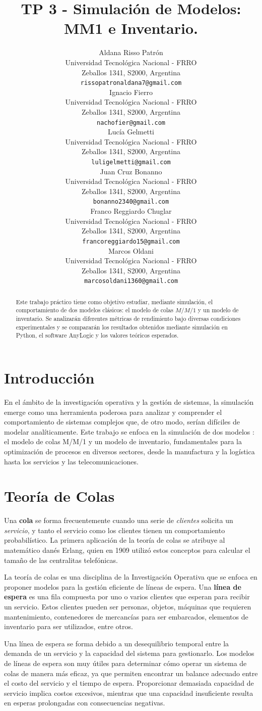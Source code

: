 \documentclass{article}
\title{TP 3 - Simulación de Modelos: MM1 e Inventario.}
\author{
 Aldana Risso Patrón \\
  Universidad Tecnológica Nacional - FRRO \\
  Zeballos 1341, S2000, Argentina \\
  \texttt{rissopatronaldana7@gmail.com} \\
   \And
 Ignacio Fierro \\
  Universidad Tecnológica Nacional - FRRO \\
  Zeballos 1341, S2000, Argentina \\
  \texttt{nachofier@gmail.com} \\
  \And
 Lucía Gelmetti \\
  Universidad Tecnológica Nacional - FRRO \\
  Zeballos 1341, S2000, Argentina \\
  \texttt{luligelmetti@gmail.com} \\
  \And
 Juan Cruz Bonanno \\
  Universidad Tecnológica Nacional - FRRO \\
  Zeballos 1341, S2000, Argentina \\
  \texttt{bonanno2340@gmail.com} \\
  \And
 Franco Reggiardo Chuglar \\
  Universidad Tecnológica Nacional - FRRO\\
  Zeballos 1341, S2000, Argentina \\
  \texttt{francoreggiardo15@gmail.com} \\
  \And
 Marcos Oldani \\
  Universidad Tecnológica Nacional - FRRO \\
  Zeballos 1341, S2000, Argentina \\
  \texttt{marcosoldani1360@gmail.com} \\
}
\begin{document}
\maketitle
\begin{abstract}
Este trabajo práctico tiene como objetivo estudiar, mediante simulación, el comportamiento de dos modelos clásicos: el modelo de colas \( M/M/1 \) y un modelo de inventario. Se analizarán diferentes métricas de rendimiento bajo diversas condiciones experimentales y se compararán los resultados obtenidos mediante simulación en Python, el software AnyLogic y los valores teóricos esperados.
\end{abstract}

\section{Introducción}
En el ámbito de la investigación operativa y la gestión de sistemas, la simulación emerge como una herramienta poderosa para analizar y comprender el comportamiento de sistemas complejos que, de otro modo, serían difíciles de modelar analíticamente. Este trabajo se enfoca en la simulación de dos modelos : el modelo de colas M/M/1 y un modelo de inventario, fundamentales para la optimización de procesos en diversos sectores, desde la manufactura y la logística hasta los servicios y las telecomunicaciones.

\section{Teoría de Colas}
Una \textbf{cola} se forma frecuentemente cuando una serie de \textit{clientes} solicita un \textit{servicio}, y tanto el servicio como los clientes tienen un comportamiento probabilístico. La primera aplicación de la teoría de colas se atribuye al matemático danés Erlang, quien en 1909 utilizó estos conceptos para calcular el tamaño de las centralitas telefónicas.

La teoría de colas es una disciplina de la Investigación Operativa que se enfoca en proponer modelos para la gestión eficiente de líneas de espera. Una \textbf{línea de espera} es una fila compuesta por uno o varios clientes que esperan para recibir un servicio. Estos clientes pueden ser personas, objetos, máquinas que requieren mantenimiento, contenedores de mercancías para ser embarcados, elementos de inventario para ser utilizados, entre otros.

Una línea de espera se forma debido a un desequilibrio temporal entre la demanda de un servicio y la capacidad del sistema para gestionarlo. Los modelos de líneas de espera son muy útiles para determinar cómo operar un sistema de colas de manera más eficaz, ya que permiten encontrar un balance adecuado entre el costo del servicio y el tiempo de espera. Proporcionar demasiada capacidad de servicio implica costos excesivos, mientras que una capacidad insuficiente resulta en esperas prolongadas con consecuencias negativas.
\end{document}

